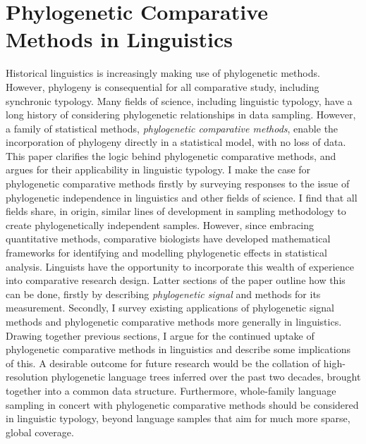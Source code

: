 \chapter[Phylogenetic Comparative Methods]{Phylogenetic Comparative Methods in Linguistics}
\label{Chap:pcms-in-ling}	%
\pagestyle{headings}


Historical linguistics is increasingly making use of phylogenetic methods. However, phylogeny is consequential for all comparative study, including synchronic typology. Many fields of science, including linguistic typology, have a long history of considering phylogenetic relationships in data sampling. However, a family of statistical methods, \emph{phylogenetic comparative methods}, enable the incorporation of phylogeny directly in a statistical model, with no loss of data. This paper clarifies the logic behind phylogenetic comparative methods, and argues for their applicability in linguistic typology. I make the case for phylogenetic comparative methods firstly by surveying responses to the issue of phylogenetic independence in linguistics and other fields of science. I find that all fields share, in origin, similar lines of development in sampling methodology to create phylogenetically independent samples. However, since embracing quantitative methods, comparative biologists have developed mathematical frameworks for identifying and modelling phylogenetic effects in statistical analysis. Linguists have the opportunity to incorporate this wealth of experience into comparative research design. Latter sections of the paper outline how this can be done, firstly by describing \emph{phylogenetic signal} and methods for its measurement. Secondly, I survey existing applications of phylogenetic signal methods and phylogenetic comparative methods more generally in linguistics. Drawing together previous sections, I argue for the continued uptake of phylogenetic comparative methods in linguistics and describe some implications of this. A desirable outcome for future research would be the collation of high-resolution phylogenetic language trees inferred over the past two decades, brought together into a common data structure. Furthermore, whole-family language sampling in concert with phylogenetic comparative methods should be considered in linguistic typology, beyond language samples that aim for much more sparse, global coverage.

